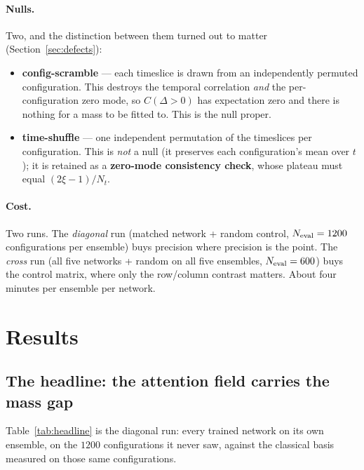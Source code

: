 \documentclass[11pt,a4paper]{article}
\begin{document}
\paragraph{Nulls.} Two, and the distinction between them turned out to matter
(Section~\ref{sec:defects}):
\begin{itemize}
  \item \textbf{config-scramble} --- each timeslice is drawn from an
        independently permuted configuration. This destroys the temporal
        correlation \emph{and} the per-configuration zero mode, so $C(\Delta>0)$
        has expectation zero and there is nothing for a mass to be fitted to.
        This is the null proper.
  \item \textbf{time-shuffle} --- one independent permutation of the timeslices
        per configuration. This is \emph{not} a null (it preserves each
        configuration's mean over $t$); it is retained as a
        \textbf{zero-mode consistency check}, whose plateau must equal
        $(2\xi-1)/N_t$.
\end{itemize}

\paragraph{Cost.} Two runs. The \emph{diagonal} run (matched network + random
control, $N_{\rm eval} = 1200$ configurations per ensemble) buys precision where
precision is the point. The \emph{cross} run (all five networks + random on all
five ensembles, $N_{\rm eval} = 600$) buys the control matrix, where only the
row/column contrast matters. About four minutes per ensemble per network.

\section{Results}
\label{sec:results}

\subsection{The headline: the attention field carries the mass gap}
\label{sec:headline}

Table~\ref{tab:headline} is the diagonal run: every trained network on its own
ensemble, on the $1200$ configurations it never saw, against the classical basis
measured on those same configurations.
\end{document}
